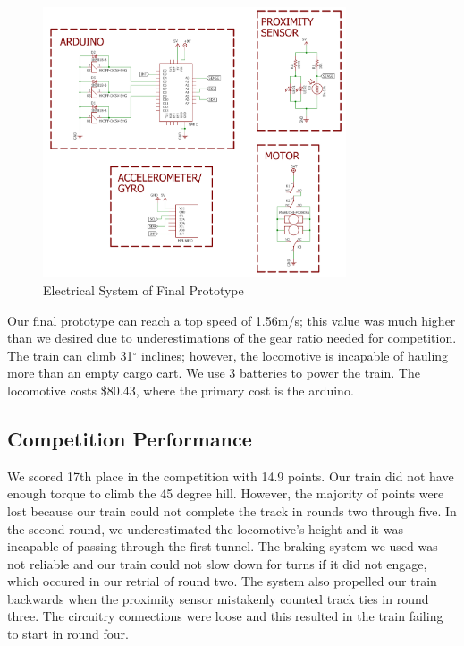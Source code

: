 \documentclass[class=../report, crop=false]{standalone}
\begin{document}
\begin{figure}[H]
	\centering
	\includegraphics[width=0.8\textwidth]{../res/img/circuit}
	\caption{Electrical System of Final Prototype}
	\label{fig:circuit}
\end{figure}

Our final prototype can reach a top speed of 1.56m/s; this value was much higher than we desired due to underestimations of the gear ratio needed for competition.
The train can climb 31$^{\circ}$ inclines; however, the locomotive is incapable of hauling more than an empty cargo cart.
We use 3 batteries to power the train.
The locomotive costs \$80.43\footnotemark, where the primary cost is the arduino.

\subsection{Competition Performance}

We scored 17th place in the competition with 14.9 points.
Our train did not have enough torque to climb the 45 degree hill.
However, the majority of points were lost because our train could not complete the track in rounds two through five.
In the second round, we underestimated the locomotive’s height and it was incapable of passing through the first tunnel.
The braking system we used was not reliable and our train could not slow down for turns if it did not engage, which occured in our retrial of round two.
The system also propelled our train backwards when the proximity sensor mistakenly counted track ties in round three.
The circuitry connections were loose and this resulted in the train failing to start in round four.
\end{document}
